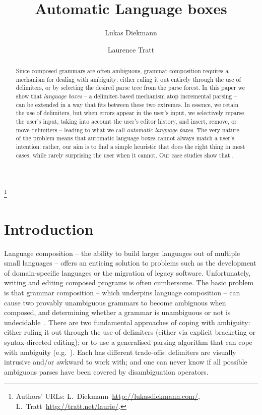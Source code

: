 \documentclass[sigplan,screen]{acmart}\settopmatter{printfolios=true,printccs=false,printacmref=false}
\begin{document}
\title{Automatic Language boxes}

\author{Lukas Diekmann}
\author{Laurence Tratt}
\thanks{Authors' URLs: %
    L.~Diekmann~\url{http://lukasdiekmann.com/},
    L.~Tratt~\url{http://tratt.net/laurie/}.
}


\begin{abstract}
Since composed grammars are often ambiguous, grammar composition requires a
mechanism for dealing with ambiguity: either ruling it out entirely through the use of
delimiters, or by selecting the desired parse tree from the parse forest.  In
this paper we show that \emph{language boxes} -- a delimiter-based
mechanism atop incremental parsing -- can be extended in a way that fits
between these two extremes. In essence, we retain the use of delimiters, but
when errors appear in the user's input, we selectively reparse the user's
input, taking into account the user's editor history, and insert, remove,
or move delimiters -- leading to what we call \emph{automatic language
boxes}. The very nature of the problem means that automatic language boxes
cannot always match a user's intention: rather, our aim is to find a simple
heuristic that does the right thing in most cases, while rarely surprising the
user when it cannot. Our case studies show that .
\end{abstract}


\maketitle

\section{Introduction}

Language composition -- the ability to build larger languages out of multiple
small languages -- offers an enticing solution to problems such as the
development of domain-specific languages or the migration of legacy software.
Unfortunately, writing and editing composed programs is often cumbersome.
The basic problem is that grammar
composition -- which underpins language composition -- can cause
two provably unambiguous grammars to become ambiguous when composed,
and determining whether a grammar is unambiguous or not is
undecidable~\cite{cantor62ambiguity}. There are two fundamental approaches
of coping with ambiguity: either ruling it out through the use of
delimiters (either via explicit bracketing or syntax-directed
editing); or to use a generalised parsing algorithm that can cope with ambiguity
(e.g.~\cite{visser97scannerless}). Each has different trade-offs: delimiters
are visually intrusive and/or awkward to work with; and one can never know if all possible
ambiguous parses have been covered by disambiguation operators.
\end{document}
